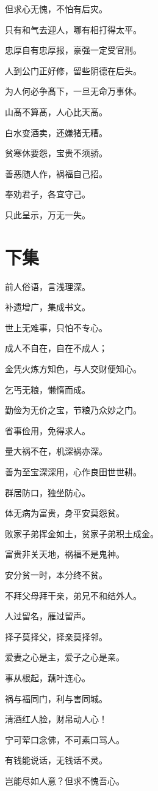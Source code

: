 \documentclass[12pt,oneside]{book}
\begin{document}
但求心无愧，不怕有后灾。

只有和气去迎人，哪有相打得太平。

忠厚自有忠厚报，豪强一定受官刑。

人到公门正好修，留些阴德在后头。

为人何必争髙下，一旦无命万事休。

山髙不算髙，人心比天髙。

白水变酒卖，还嫌猪无糟。

贫寒休要怨，宝贵不须骄。

善恶随人作，祸福自己招。

奉劝君子，各宜守己。

只此呈示，万无一失。

\section{下集}
前人俗语，言浅理深。

补遗增广，集成书文。

世上无难事，只怕不专心。

成人不自在，自在不成人；

金凭火炼方知色，与人交财便知心。

乞丐无粮，懒惰而成。

勤俭为无价之宝，节粮乃众妙之门。

省事俭用，免得求人。

量大祸不在，机深祸亦深。

善为至宝深深用，心作良田世世耕。

群居防口，独坐防心。

体无病为富贵，身平安莫怨贫。

败家子弟挥金如土，贫家子弟积土成金。

富贵非关天地，祸福不是鬼神。

安分贫一时，本分终不贫。

不拜父母拜干亲，弟兄不和结外人。

人过留名，雁过留声。

择子莫择父，择亲莫择邻。

爱妻之心是主，爱子之心是亲。

事从根起，藕叶连心。

祸与福同门，利与害同城。

淸酒红人脸，财帛动人心！

宁可荤口念佛，不可素口骂人。

有钱能说话，无钱话不灵。

岂能尽如人意？但求不愧吾心。
\end{document}
